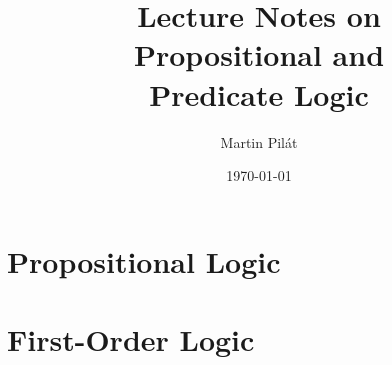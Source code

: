 \documentclass[a4paper,nofonts,justified,colorinlistoftodos,hidelinks]{tufte-book}
\title{Lecture Notes on \\ Propositional and \\ Predicate Logic}
\author{Martin Pilát}
\date{\today}
\begin{document}
\maketitle

\mainmatter



\part{Propositional Logic}



\part{First-Order Logic}



\backmatter

\setcounter{tocdepth}{2}
\tableofcontents
\listoffigures
\listoftables
\listofalgorithms 
\listoftodos
\end{document}
